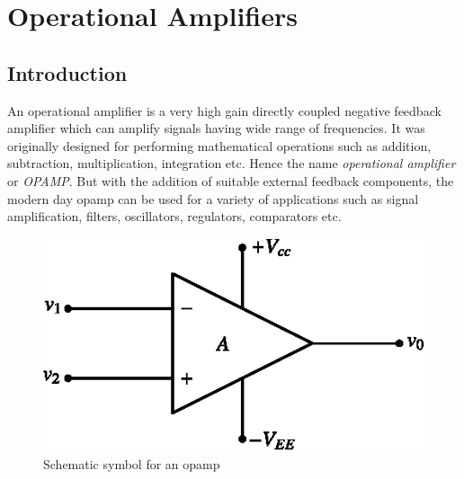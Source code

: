 \makeatletter
\def\@makechapterhead#1{%
  \vspace*{10\p@}%
  {\parindent \z@ \raggedleft \normalfont
    \ifnum \c@secnumdepth >\m@ne
      \if@mainmatter
        \LARGE\bfseries \@chapapp\space \thechapter
	\vskip 4pt
        \hrule height 2pt
        \par\nobreak
        \vskip 5\p@
      \fi
    \fi
    \interlinepenalty\@M
    \huge \bfseries #1\par\nobreak
\vskip 5pt

\hrule height 2pt   
 \vskip 10\p@  
  }}
\makeatother

\setcounter{chapter}{3}
\chapter{Operational Amplifiers}\label{chap4}

\section{Introduction}\label{sec4.1}

An operational amplifier is a very high gain directly coupled negative feedback amplifier which can amplify signals having wide range of frequencies. It was originally designed for performing mathematical operations such as addition, subtraction, multiplication, integration etc. Hence the name {\em operational amplifier} or {\em OPAMP}. But with the addition of suitable external feedback components, the modern day opamp can be used for a variety of applications such as signal amplification, filters, oscillators, regulators, comparators  etc.

\smallskip
{}
\begin{figure}[H]
\centering
\includegraphics{chap4/fig4.1.eps}
\caption{Schematic symbol for an opamp}\label{fig4.1}
\end{figure}

